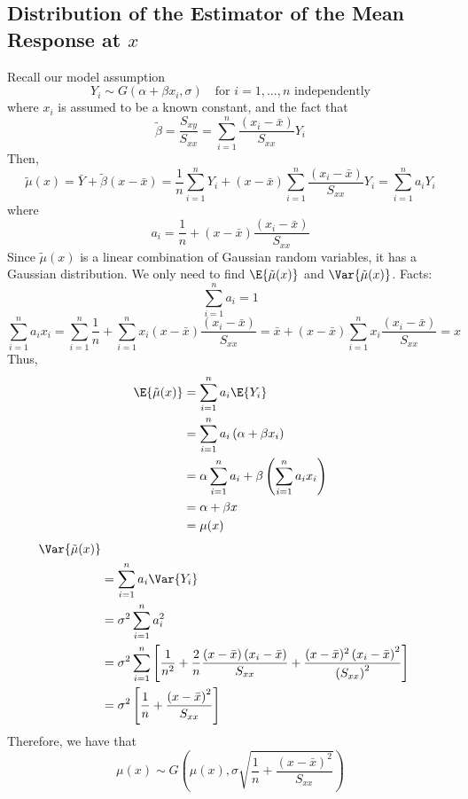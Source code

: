 \documentclass[oneside]{book}
\begin{document}
\subsection{Distribution of the Estimator of the Mean Response at $ x $}
Recall our model assumption
\[Y_{i} \sim G\left(\alpha+\beta x_{i}, \sigma\right)
    \quad \text{for } i=1, \ldots, n \text{ independently}\]
where $ x_i $ is assumed to be a known constant, and the fact that
\[\tilde{\beta}=\frac{S_{x y}}{S_{x x}}=\sum_{i=1}^{n} \frac{\left(x_{i}-\bar{x}\right)}{S_{x x}} Y_{i}\]
Then,
\[\tilde{\mu}(x)=\bar{Y}+\tilde{\beta}(x-\bar{x})=\frac{1}{n} \sum_{i=1}^{n} Y_{i}+(x-\bar{x})
    \sum_{i=1}^{n} \frac{\left(x_{i}-\bar{x}\right)}{S_{x x}} Y_{i}=\sum_{i=1}^{n} a_{i} Y_{i}\]
where
\[a_{i}=\frac{1}{n}+(x-\bar{x}) \frac{\left(x_{i}-\bar{x}\right)}{S_{x x}}\]
Since $ \tilde{\mu}(x) $ is a linear combination of Gaussian random variables, it has a Gaussian
distribution. We only need to find $ \E{\tilde{\mu}(x)} $ and $ \Var{\tilde{\mu}(x)} $.
Facts:
\[ \sum\limits_{i=1}^{n} a_i=1 \]
\[ \sum\limits_{i=1}^{n} a_i x_i=\sum\limits_{i=1}^{n} \frac{1}{n} +
    \sum\limits_{i=1}^{n} x_i\left( x-\bar{x} \right)\frac{(x_i-\bar{x})}{S_{xx}}
    =\bar{x}+\left( x-\bar{x} \right)\sum\limits_{i=1}^{n} x_i \frac{\left( x_i-\bar{x} \right)}{S_{xx}}=x  \]
Thus,
\[
    \begin{aligned}
        \E{\tilde{\mu}(x)}
         & =\sum\limits_{i=1}^{n} a_i\E{Y_i}                                                   \\
         & =\sum\limits_{i=1}^{n} a_i\left( \alpha+\beta x_i \right)                           \\
         & =\alpha \sum\limits_{i=1}^{n} a_i+\beta\left( \sum\limits_{i=1}^{n} a_i x_i \right) \\
         & =\alpha+\beta x                                                                     \\
         & =\mu(x)
    \end{aligned}
\]
\[
    \begin{aligned}
        \Var{\tilde{\mu}(x)}                                                                                                  \\
         & =\sum\limits_{i=1}^{n} a_i\Var{Y_i}                                                                                \\
         & =\sigma^2 \sum\limits_{i=1}^{n} a_i^2                                                                              \\
         & =\sigma^{2} \sum_{i=1}^{n}\left[\frac{1}{n^{2}}+\frac{2}{n} \frac{(x-\bar{x})\left(x_{i}-\bar{x}\right)}{S_{x x}}+
        \frac{(x-\bar{x})^{2}\left(x_{i}-\bar{x}\right)^{2}}{\left(S_{x x}\right)^{2}}\right]                                 \\
         & =\sigma^2\left[ \frac{1}{n} +\frac{\left( x-\bar{x} \right)^2}{S_{xx}}  \right]
    \end{aligned}
\]
Therefore, we have that
\[\mu(x) \sim G\left(\mu(x), \sigma \sqrt{\frac{1}{n}+\frac{(x-\bar{x})^{2}}{S_{x x}}}\right)\]
\end{document}
